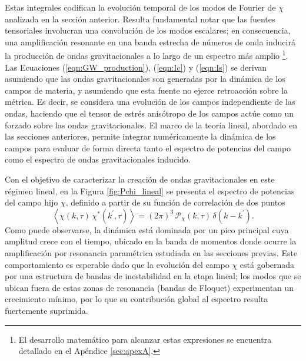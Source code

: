Estas integrales codifican la evolución temporal de los modos de Fourier de $\chi$ analizada en la sección anterior. Resulta fundamental notar que las fuentes tensoriales involucran una convolución de los modos escalares; en consecuencia, una amplificación resonante en una banda estrecha de números de onda inducirá la producción de ondas gravitacionales a lo largo de un espectro más amplio \cite{Figueroa_2017_GW}\footnote{El desarrollo matemático para alcanzar estas expresiones se encuentra detallado en el Apéndice \ref{sec:apexA}.}. Las Ecuaciones (\ref{eqn:GW_production}), (\ref{eqn:Ic}) y (\ref{eqn:Is}) se derivan asumiendo que las ondas gravitacionales son generadas por la dinámica de los campos de materia, y asumiendo que esta fuente no ejerce retroacción sobre la métrica. Es decir, se considera una evolución de los campos independiente de las ondas, haciendo que el tensor de estrés anisótropo de los campos actúe como un forzado sobre las ondas gravitacionales. El marco de la teoría lineal, abordado en las secciones anteriores, permite integrar numéricamente la dinámica de los campos para evaluar de forma directa tanto el espectro de potencias del campo como el espectro de ondas gravitacionales inducido.

Con el objetivo de caracterizar la creación de ondas gravitacionales en este régimen lineal, en la Figura \ref{fig:Pchi_lineal} se presenta el espectro de potencias del campo hijo $\chi$, definido a partir de su función de correlación de dos puntos
\begin{equation}
    \left\langle \chi (k, \tau) \, \chi^* \left( k^\prime, \tau \right) \right\rangle = (2 \pi)^3 \, \mathcal{P}_\chi (k, \tau) \, \delta \left( k - k^\prime \right).
\end{equation}
Como puede observarse, la dinámica está dominada por un pico principal cuya amplitud crece con el tiempo, ubicado en la banda de momentos donde ocurre la amplificación por resonancia paramétrica estudiada en las secciones previas. Este comportamiento es esperable dado que la evolución del campo $\chi$ está gobernada por una estructura de bandas de inestabilidad en la etapa lineal; los modos que se ubican fuera de estas zonas de resonancia (bandas de Floquet) experimentan un crecimiento mínimo, por lo que su contribución global al espectro resulta fuertemente suprimida.

